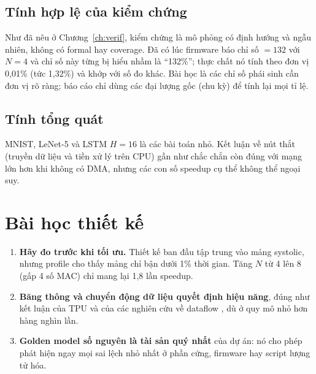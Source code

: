 \subsection{Tính hợp lệ của kiểm chứng}
Như đã nêu ở Chương~\ref{ch:verif}, kiểm chứng là mô phỏng có định hướng và ngẫu nhiên, không có formal hay coverage. Đã có lúc firmware báo chỉ số $=132$ với $N=4$ và chỉ số này từng bị hiểu nhầm là ``132\%''; thực chất nó tính theo đơn vị 0,01\% (tức 1,32\%) và khớp với số đo khác. Bài học là các chỉ số phái sinh cần đơn vị rõ ràng; báo cáo chỉ dùng các đại lượng gốc (chu kỳ) để tính lại mọi tỉ lệ.

\subsection{Tính tổng quát}
MNIST, LeNet-5 và LSTM $H=16$ là các bài toán nhỏ. Kết luận về nút thắt (truyền dữ liệu và tiền xử lý trên CPU) gần như chắc chắn còn đúng với mạng lớn hơn khi không có DMA, nhưng các con số speedup cụ thể không thể ngoại suy.

\section{Bài học thiết kế}
\begin{enumerate}
  \item \textbf{Hãy đo trước khi tối ưu.} Thiết kế ban đầu tập trung vào mảng systolic, nhưng profile cho thấy mảng chỉ bận dưới 1\% thời gian. Tăng $N$ từ 4 lên 8 (gấp 4 số MAC) chỉ mang lại 1,8 lần speedup.
  \item \textbf{Băng thông và chuyển động dữ liệu quyết định hiệu năng}, đúng như kết luận của TPU \cite{jouppi2017tpu} và của các nghiên cứu về dataflow \cite{sze2017survey}, dù ở quy mô nhỏ hơn hàng nghìn lần.
  \item \textbf{Golden model số nguyên là tài sản quý nhất} của dự án: nó cho phép phát hiện ngay mọi sai lệch nhỏ nhất ở phần cứng, firmware hay script lượng tử hóa.
\end{enumerate}
